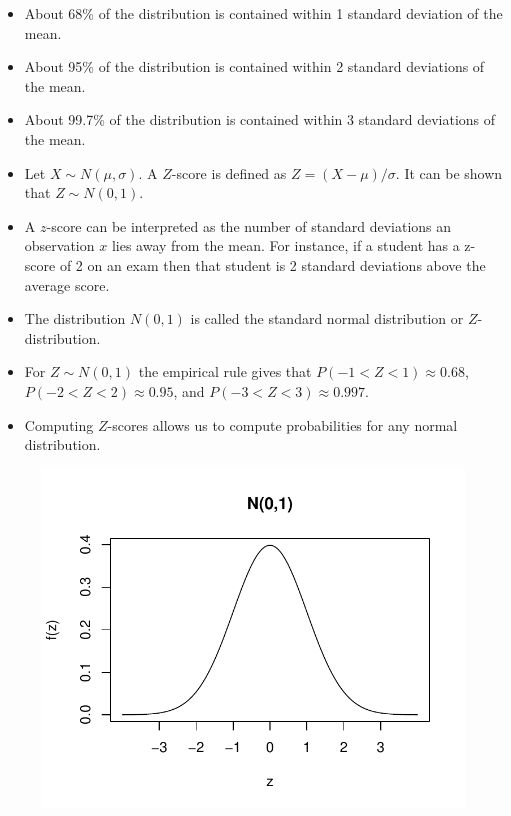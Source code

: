 \documentclass[fleqn, 11pt]{article}
\begin{document}
\begin{itemize}
\begin{figure}[ht]
\end{figure}
\begin{itemize}
\item About 68\% of the distribution is contained within 1 standard deviation of the mean.
\vspace{25pt}
\item About 95\% of the distribution is contained within 2 standard deviations of the mean.
\vspace{25pt}
\item About 99.7\% of the distribution is contained within 3 standard deviations of the mean.
\end{itemize}
\end{itemize}
\clearpage


\begin{itemize}
\item Let $X \sim N(\mu, \sigma)$. A $Z$-score is defined as $Z=(X-\mu) / \sigma$.  It can be shown that $Z \sim N(0,1)$.
\item A $z$-score can be interpreted as the number of standard deviations an observation $x$ lies away from the mean.  For instance, if a student has a z-score of 2 on an exam then that student is 2 standard deviations above the average score. 
\item The distribution $N(0,1)$ is called the standard normal distribution or $Z$-distribution.
\item For $Z \sim N(0,1)$ the empirical rule gives that $P(-1 < Z < 1) \approx 0.68$, $P(-2 < Z < 2) \approx 0.95$, and $P(-3 < Z < 3) \approx 0.997$.
\item Computing $Z$-scores allows us to compute probabilities for any normal distribution.
\end{itemize}
\begin{figure}[ht]
\includegraphics[scale=0.5]{figure/standnorm.pdf}
\end{figure}
\end{document}
